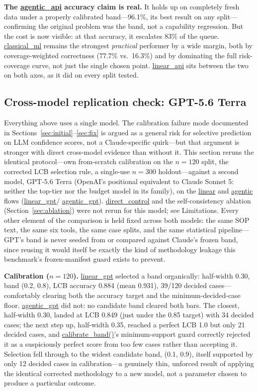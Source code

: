 \documentclass[]{ieeeaccess}
\newcommand{\code}[1]{\url{#1}}
\begin{document}
\textbf{The \code{agentic_api} accuracy claim is real.} It holds up on
completely fresh data under a properly calibrated band---96.1\%, its
best result on any split---confirming the original problem was the
band, not a capability regression. But the cost is now visible:
at that accuracy, it escalates 83\% of the queue. \code{classical_ml}
remains the strongest \textit{practical} performer by a wide margin, both
by coverage-weighted correctness (77.7\% vs.\ 16.3\%) and by dominating
the full risk-coverage curve, not just the single chosen point.
\code{linear_api} sits between the two on both axes, as it did on every
split tested.

\subsection{Cross-model replication check: GPT-5.6 Terra}\label{sec:gpt}

Everything above uses a single model. The calibration failure mode
documented in Sections~\ref{sec:initial}--\ref{sec:fix} is argued as a general risk for
selective prediction on LLM confidence scores, not a Claude-specific
quirk---but that argument is stronger with direct cross-model evidence
than without it. This section reruns the identical protocol---own
from-scratch calibration on the $n=120$ split, the corrected LCB
selection rule, a single-use $n=300$ holdout---against a second model,
GPT-5.6 Terra (OpenAI's positional equivalent to Claude Sonnet 5:
neither the top-tier nor the budget model in its family), on the
\code{linear} and \code{agentic} flows (\code{linear_gpt}/%
\code{agentic_gpt}). \code{direct_control} and the self-consistency
ablation (Section~\ref{sec:ablation}) were not rerun for this model; see Limitations.
Every other element of the comparison is held fixed across both models:
the same SOP text, the same six tools, the same case splits, and the
same statistical pipeline---GPT's band is never seeded from or compared
against Claude's frozen band, since reusing it would itself be exactly
the kind of methodology leakage this benchmark's frozen-manifest guard
exists to prevent.

\textbf{Calibration ($n=120$).} \code{linear_gpt} selected a band
organically: half-width 0.30, band (0.2, 0.8), LCB accuracy 0.884 (mean
0.931), 39/120 decided cases---comfortably clearing both the accuracy
target and the minimum-decided-case floor. \code{agentic_gpt} did not:
no candidate band cleared both bars. The closest, half-width 0.30, landed
at LCB 0.849 (just under the 0.85 target) with 34 decided cases; the next
step up, half-width 0.35, reached a perfect LCB 1.0 but only 21 decided
cases, and \code{calibrate_band()}'s minimum-support guard correctly
rejected it as a suspiciously perfect score from too few cases rather
than accepting it. Selection fell through to the widest candidate band,
(0.1, 0.9), itself supported by only 12 decided cases in calibration---a genuinely thin, unforced result of applying the identical corrected
methodology to a new model, not a parameter chosen to produce a
particular outcome.
\end{document}
